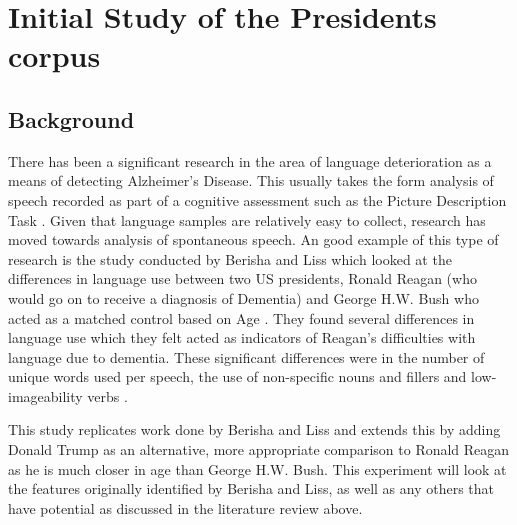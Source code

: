 \documentclass[10pt, letterpaper, twoside, openany]{book}
\begin{document}
\chapter{Initial Study of the Presidents corpus}
\section{Background}
There has been a significant research in the area of language deterioration as a means of detecting Alzheimer's Disease. This usually takes the form analysis of speech recorded as part of a cognitive assessment such as the Picture Description Task \cite{Orimaye2014,Fraser2015}. Given that language samples are relatively easy to collect, research has moved towards analysis of spontaneous speech. An good example of this type of research is the study conducted by Berisha and Liss which looked at the differences in language use between two US presidents, Ronald Reagan (who would go on to receive a diagnosis of Dementia) and George H.W. Bush who acted as a matched control based on Age \cite{Berisha2015}. They found several differences in language use which they felt acted as indicators of Reagan's difficulties with language due to dementia. These significant differences were in the number of unique words used per speech, the use of non-specific nouns and fillers and low-imageability verbs \cite{Berisha2015}. 
\par   
This study replicates work done by Berisha and Liss and extends this by adding Donald Trump as an alternative, more appropriate comparison to Ronald Reagan as he is much closer in age than George H.W. Bush. This experiment will look at the features originally identified by Berisha and Liss, as well as any others that have potential as discussed in the literature review above. 
\end{document}
